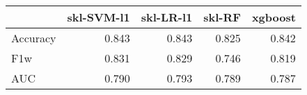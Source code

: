 \begin{tabular}{lrrrr}
\toprule
{} &  skl-SVM-l1 &  skl-LR-l1 &  skl-RF &  xgboost \\
\midrule
Accuracy &       0.843 &      0.843 &   0.825 &    0.842 \\
F1w      &       0.831 &      0.829 &   0.746 &    0.819 \\
AUC      &       0.790 &      0.793 &   0.789 &    0.787 \\
\bottomrule
\end{tabular}
